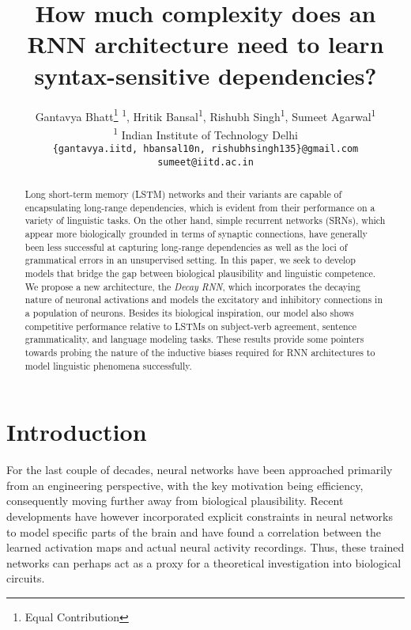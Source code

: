 \documentclass[11pt,a4paper]{article}
\title{How much complexity does an RNN architecture need to learn syntax-sensitive dependencies?}
\author{
Gantavya Bhatt\thanks{Equal Contribution} \textsuperscript{ 1}, Hritik Bansal\printfnsymbol{1}\textsuperscript{1}, Rishubh Singh\printfnsymbol{1}\textsuperscript{1}, Sumeet Agarwal\textsuperscript{1}\\
  \textsuperscript{1} Indian Institute of Technology Delhi\\
  \texttt{\{gantavya.iitd, hbansal10n, rishubhsingh135\}@gmail.com} \\
  \texttt{sumeet@iitd.ac.in} 
}
\date{}
\begin{document}
\maketitle
\begin{abstract}
Long short-term memory (LSTM) networks and their variants are capable of encapsulating long-range dependencies, which is evident from their performance on a variety of linguistic tasks. On the other hand, simple recurrent networks (SRNs), which appear more biologically grounded in terms of synaptic connections, have generally been less successful at capturing long-range dependencies as well as the loci of grammatical errors in an unsupervised setting. In this paper, we seek to develop models that bridge the gap between biological plausibility and linguistic competence. We propose a new architecture, the {\em Decay RNN}, which incorporates the decaying nature of neuronal activations and models the excitatory and inhibitory connections in a population of neurons. Besides its biological inspiration, our model also shows competitive performance relative to LSTMs on subject-verb agreement, sentence grammaticality, and language modeling tasks. These results provide some pointers towards probing the nature of the inductive biases required for RNN architectures to model linguistic phenomena successfully.
\end{abstract}

\section{Introduction}
\label{sec:Introduction}
For the last couple of decades, neural networks have been approached primarily from an engineering perspective, with the key motivation being efficiency, consequently moving further away from biological plausibility. Recent developments \cite{song2016training, gao2015simplicity,sussillo2013opening} have however incorporated explicit constraints in neural networks to model specific parts of the brain and have found a correlation between the learned activation maps and actual neural activity recordings. Thus, these trained networks can perhaps act as a proxy for a theoretical investigation into biological circuits.
\end{document}
